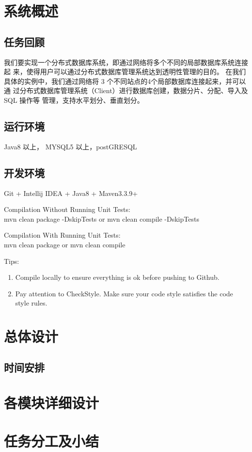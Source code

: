 \documentclass{ctexart}
\begin{document}
 
\tableofcontents
 
 
\section{系统概述}
\subsection{任务回顾}
我们要实现一个分布式数据库系统，即通过网络将多个不同的局部数据库系统连接起
来，使得用户可以通过分布式数据库管理系统达到透明性管理的目的。
在我们具体的实例中，我们通过网络将 3 个不同站点的4个局部数据库连接起来，并可以通
过分布式数据库管理系统（Client）进行数据库创建，数据分片、分配、导入及 SQL 操作等
管理，支持水平划分、垂直划分。


\subsection{运行环境}
Java8 以上， MYSQL5 以上，postGRESQL

\subsection{开发环境}
 Git + Intellij IDEA + Java8 + Maven3.3.9+
 
 Compilation Without Running Unit Tests:\\
 mvn clean package -DskipTests or mvn clean compile -DskipTests
 
 Compilation With Running Unit Tests:\\
 mvn clean package or mvn clean compile
 
 Tips:
 \begin{enumerate}[1]
 	\item Compile locally to ensure everything is ok before pushing to Github.
 	\item Pay attention to CheckStyle. Make sure your code style satisfies the code style rules.
 \end{enumerate}
 
 
 
\section{总体设计}


\subsection{时间安排}
\begin{figure}
\end{figure}

\section{各模块详细设计}

\section{任务分工及小结}
 
\end{document}
